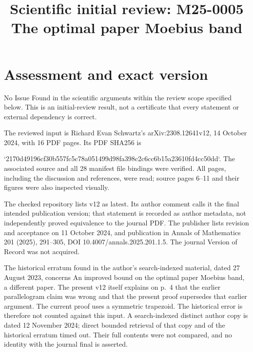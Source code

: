 \documentclass[10pt]{article}
\title{Scientific initial review: M25-0005
The optimal paper Moebius band}
\author{}
\date{}
\begin{document}
\maketitle
\section*{Assessment and exact version}
No Issue Found in the scientific arguments within the review scope specified below. This is an initial-review result, not a certificate that every statement or external dependency is correct.\par
The reviewed input is Richard Evan Schwartz’s arXiv:2308.12641v12, 14 October 2024, with 16 PDF pages. Its PDF SHA256 is\par
`2170d49196cf30b557fc5c78a051499d98fa398c2c6cc6b15a23610fd4cc50dd`. The associated source and all 28 manifest file bindings were verified. All pages, including the discussion and references, were read; source pages 6–11 and their figures were also inspected visually.\par
The checked repository lists v12 as latest. Its author comment calls it the final intended publication version; that statement is recorded as author metadata, not independently proved equivalence to the journal PDF. The publisher lists revision and acceptance on 11 October 2024, and publication in Annals of Mathematics 201 (2025), 291–305, DOI 10.4007/annals.2025.201.1.5. The journal Version of Record was not acquired.\par
The historical erratum found in the author’s search-indexed material, dated 27 August 2023, concerns An improved bound on the optimal paper Moebius band, a different paper. The present v12 itself explains on p. 4 that the earlier parallelogram claim was wrong and that the present proof supersedes that earlier argument. The current proof uses a symmetric trapezoid. The historical error is therefore not counted against this input. A search-indexed distinct author copy is dated 12 November 2024; direct bounded retrieval of that copy and of the historical erratum timed out. Their full contents were not compared, and no identity with the journal final is asserted.\par
\end{document}
